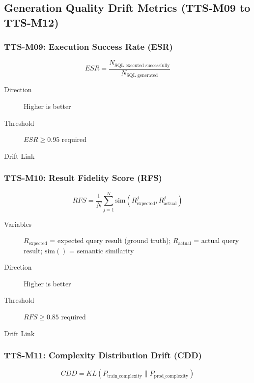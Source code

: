 \subsection{Generation Quality Drift Metrics (TTS-M09 to TTS-M12)}

\subsubsection{TTS-M09: Execution Success Rate (ESR)}

\begin{equation}
\boxed{
ESR = \frac{N_{\text{SQL executed successfully}}}{N_{\text{SQL generated}}}
}
\end{equation}

\begin{description}
  \item[Direction] Higher is better
  \item[Threshold] $ESR \geq 0.95$ required
  \item[Drift Link] 
\end{description}

\subsubsection{TTS-M10: Result Fidelity Score (RFS)}

\begin{equation}
\boxed{
RFS = \frac{1}{N} \sum_{j=1}^{N} \text{sim}(R_{\text{expected}}^j, R_{\text{actual}}^j)
}
\end{equation}

\begin{description}
  \item[Variables] $R_{\text{expected}}$ = expected query result (ground truth);
        $R_{\text{actual}}$ = actual query result; $\text{sim}()$ = semantic similarity
  \item[Direction] Higher is better
  \item[Threshold] $RFS \geq 0.85$ required
  \item[Drift Link] 
\end{description}

\subsubsection{TTS-M11: Complexity Distribution Drift (CDD)}

\begin{equation}
\boxed{
CDD = KL(P_{\text{train\_complexity}} \| P_{\text{prod\_complexity}})
}
\end{equation}

